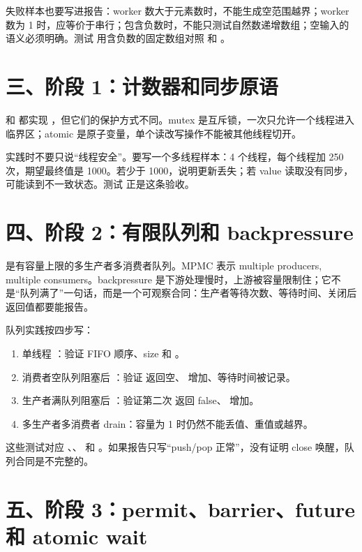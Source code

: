 失败样本也要写进报告：worker 数大于元素数时，不能生成空范围越界；worker 数为 1 时，应等价于串行；包含负数时，不能只测试自然数递增数组；空输入的语义必须明确。测试  用含负数的固定数组对照  和 。

\section{三、阶段 1：计数器和同步原语}

 和  都实现 ，但它们的保护方式不同。mutex 是互斥锁，一次只允许一个线程进入临界区；atomic 是原子变量，单个读改写操作不能被其他线程切开。

实践时不要只说“线程安全”。要写一个多线程样本：4 个线程，每个线程加 250 次，期望最终值是 1000。若少于 1000，说明更新丢失；若 value 读取没有同步，可能读到不一致状态。测试  正是这条验收。

\section{四、阶段 2：有限队列和 backpressure}

 是有容量上限的多生产者多消费者队列。MPMC 表示 multiple producers, multiple consumers。backpressure 是下游处理慢时，上游被容量限制住；它不是“队列满了”一句话，而是一个可观察合同：生产者等待次数、等待时间、关闭后返回值都要能报告。

队列实践按四步写：

\begin{enumerate}
  \item 单线程 ：验证 FIFO 顺序、size 和 。
  \item 消费者空队列阻塞后 ：验证  返回空、 增加、等待时间被记录。
  \item 生产者满队列阻塞后 ：验证第二次  返回 false、 增加。
  \item 多生产者多消费者 drain：容量为 1 时仍然不能丢值、重值或越界。
\end{enumerate}

这些测试对应 、、 和 。如果报告只写“push/pop 正常”，没有证明 close 唤醒，队列合同是不完整的。

\section{五、阶段 3：permit、barrier、future 和 atomic wait}

